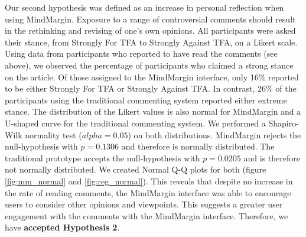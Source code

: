 Our second hypothesis was defined as an increase in personal reflection when using MindMargin. Exposure to a range of controversial comments should result in the rethinking and revising of one’s own opinions. All participants were asked their stance, from Strongly For TFA to Strongly Against TFA, on a Likert scale. Using data from participants who reported to have read the comments (see above), we observed the percentage of participants who claimed a strong stance on the article. Of those assigned to the MindMargin interface, only 16\% reported to be either Strongly For TFA or Strongly Against TFA. In contrast, 26\% of the participants using the traditional commenting system reported either extreme stance. The distribution of the Likert values is also normal for MindMargin and a U-shaped curve for the traditional commenting system. We performed a Shapiro-Wilk normality test ($alpha=0.05$) on both distributions. MindMargin rejects the null-hypothesis with $p=0.1306$ and therefore is normally distributed. The traditional prototype accepts the null-hypothesis with $p=0.0205$ and is therefore not normally distributed. We created Normal Q-Q plots for both (figure \ref{fig:mm_normal} and \ref{fig:reg_normal}). This reveals that despite no increase in the rate of reading comments, the MindMargin interface was able to encourage users to consider other opinions and viewpoints. This suggests a greater user engagement with the comments with the MindMargin interface. Therefore, we have \textbf{accepted Hypothesis 2}.

